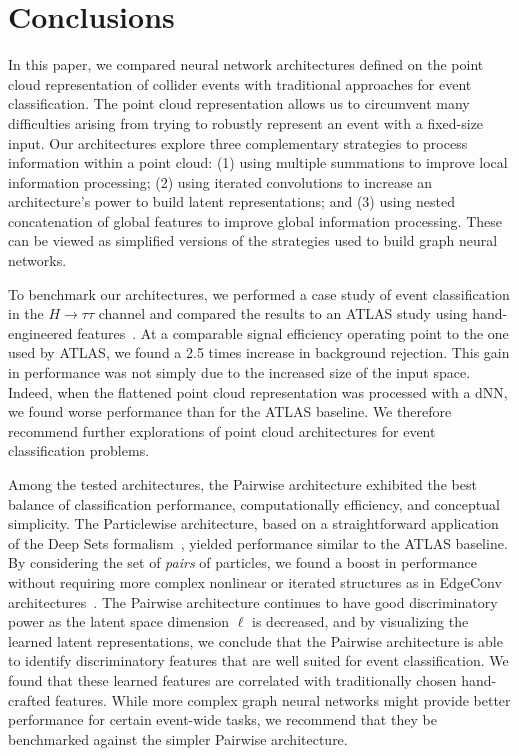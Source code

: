 \documentclass[aps,prd,twocolumn,superscriptaddress,floatfix,longbibliography,preprintnumbers,nofootinbib]{revtex4-1} %
\newif\ifptitle
\newif\ifpnumber
\newcounter{para}
\newcommand\ptitle[1]{\par\refstepcounter{para}
{\ifpnumber{\noindent\textcolor{lightgray}{\textbf{\thepara}}\indent}\fi}
{\ifptitle{\textbf{[{#1}]}}\fi}}
\begin{document}
\section{Conclusions}
\label{sec:conclusion}
\ptitle{Conclusion}


In this paper, we compared neural network architectures defined on the point cloud representation of collider events with traditional approaches for event classification.
%
The point cloud representation allows us to circumvent many difficulties arising from trying to robustly represent an event with a fixed-size input. 
%
Our architectures explore three complementary strategies to process information within a point cloud:
%
(1) using multiple summations to improve local information processing;
%
(2) using iterated convolutions to increase an architecture's power to build latent representations; and
%
(3) using nested concatenation of global features to improve global information processing.
%
These can be viewed as simplified versions of the strategies used to build graph neural networks.


To benchmark our architectures, we performed a case study of event classification in the $H\rightarrow\tau\tau$ channel and compared the results to an ATLAS study using hand-engineered features~\cite{ATLAS:2022yrq}.
%
At a comparable signal efficiency operating point to the one used by ATLAS, we found a 2.5 times increase in background rejection.
%
This gain in performance was not simply due to the increased size of the input space.
%
Indeed, when the flattened point cloud representation was processed with a dNN, we found worse performance than for the ATLAS baseline.
%
We therefore recommend further explorations of point cloud architectures for event classification problems.


Among the tested architectures, the Pairwise architecture exhibited the best balance of classification performance, computationally efficiency, and conceptual simplicity.
%
The Particlewise architecture, based on a straightforward application of the Deep Sets formalism~\cite{Zaheer2017}, yielded performance similar to the ATLAS baseline.
%
By considering the set of \emph{pairs} of particles, we found a boost in performance without requiring more complex nonlinear or iterated structures as in EdgeConv architectures~\cite{Wang:2018nkf}.
%
The Pairwise architecture continues to have good discriminatory power as the latent space dimension $\ell$ is decreased, and by visualizing the learned latent representations, we conclude that the Pairwise architecture is able to identify discriminatory features that are well suited for event classification.
%
We found that these learned features are correlated with traditionally chosen hand-crafted features.
%
While more complex graph neural networks might provide better performance for certain event-wide tasks, we recommend that they be benchmarked against the simpler Pairwise architecture.
\end{document}
